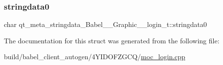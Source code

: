 \subsubsection{\texorpdfstring{stringdata0}{stringdata0}}
{\footnotesize\ttfamily char qt\+\_\+meta\+\_\+stringdata\+\_\+\+Babel\+\_\+\+\_\+\+Graphic\+\_\+\+\_\+login\+\_\+t\+::stringdata0}



The documentation for this struct was generated from the following file\+:\begin{DoxyCompactItemize}
\item 
build/babel\+\_\+client\+\_\+autogen/4\+Y\+I\+D\+O\+F\+Z\+G\+C\+Q/\hyperlink{build_2babel__client__autogen_24YIDOFZGCQ_2moc__login_8cpp}{moc\+\_\+login.\+cpp}\end{DoxyCompactItemize}
